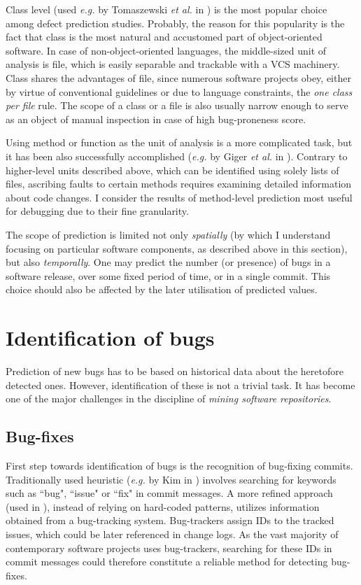 \documentclass{pracamgr}
\begin{document}
Class level (used \textit{e.g.} by Tomaszewski \textit{et al.} in \cite{Tomaszewski}) is the most popular choice among defect prediction studies. Probably, the reason for this popularity is the fact that class is the most natural and accustomed part of object-oriented software. In case of non-object-oriented languages, the middle-sized unit of analysis is file, which is easily separable and trackable with a VCS machinery. Class shares the advantages of file, since numerous software projects obey, either by virtue of conventional guidelines or due to language constraints, the \emph{one class per file} rule. The scope of a class or a file is also usually narrow enough to serve as an object of manual inspection in case of high bug-proneness score.

Using method or function as the unit of analysis is a more complicated task, but it has been also successfully accomplished (\textit{e.g.} by Giger \textit{et al.} in \cite{method-level}). Contrary to higher-level units described above, which can be identified using solely lists of files, ascribing faults to certain methods requires examining detailed information about code changes. I consider the results of method-level prediction most useful for debugging due to their fine granularity.

The scope of prediction is limited not only \emph{spatially} (by which I understand focusing on particular software components, as described above in this section), but also \emph{temporally}. One may predict the number (or presence) of bugs in a software release, over some fixed period of time, or in a single commit. This choice should also be affected by the later utilisation of predicted values.

\section{Identification of bugs}
\label{sec:identification}
Prediction of new bugs has to be based on historical data about the heretofore detected ones. However, identification of these is not a trivial task. It has become one of the major challenges in the discipline of \emph{mining software repositories}.

\subsection{Bug-fixes}
\label{sec:bug-fixes}
First step towards identification of bugs is the recognition of bug-fixing commits. Traditionally used heuristic (\textit{e.g.} by Kim in \cite{adaptive}) involves searching for keywords such as ``bug", ``issue" or ``fix" in commit messages. A more refined approach (used in \cite{Ekanayake, method-level, adaptive}), instead of relying on hard-coded patterns, utilizes information obtained from a bug-tracking system. Bug-trackers assign IDs to the tracked issues, which could be later referenced in change logs. As the vast majority of contemporary software projects uses bug-trackers, searching for these IDs in commit messages could therefore constitute a reliable method for detecting bug-fixes.
\end{document}
